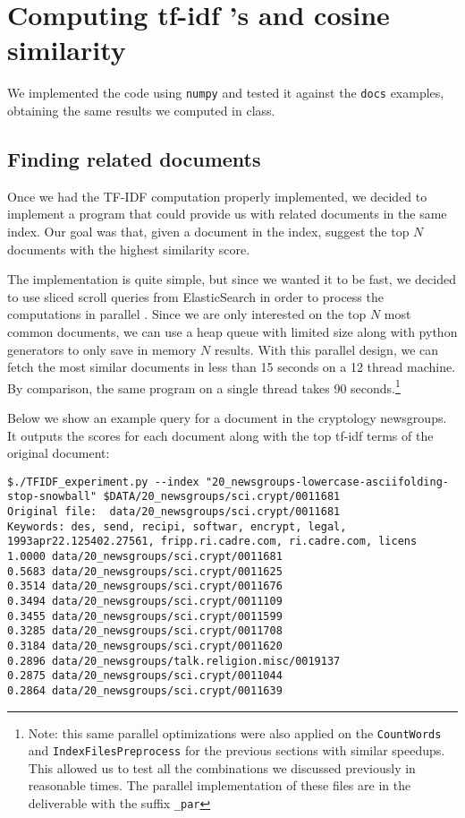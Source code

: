 \section{Computing tf-idf ’s and cosine similarity}

We implemented the code using \texttt{numpy} and tested it against the \texttt{docs} examples, obtaining
the same results we computed in class.

\subsection{Finding related documents}

Once we had the TF-IDF computation properly implemented, we decided to implement a program that could
provide us with related documents in the same index. Our goal was that, given a document in the index,
suggest the top $N$ documents with the highest similarity score.

The implementation is quite simple, but since we wanted it to be fast, we decided to use sliced scroll
queries from ElasticSearch in order to process the computations in parallel \cite{noauthor_paginate_nodate}.
Since we are only interested on the top $N$ most common documents, we can use a heap queue
with limited size along with python generators to only save in memory $N$ results. With this parallel design,
we can fetch the most similar documents in less than 15 seconds on a 12 thread machine. By comparison,
the same program on a single thread takes 90 seconds.\footnote{Note: this same parallel optimizations were also
applied on the \texttt{CountWords} and \texttt{IndexFilesPreprocess} for the previous sections with similar speedups.
This allowed us to test all the combinations we discussed previously in reasonable times.
The parallel implementation of these files are in the deliverable with the suffix \texttt{\_par}}

Below we show an example query for a document in the cryptology newsgroups. It outputs the scores for each document
along with the top tf-idf terms of the original document:
\begin{verbatim}
$./TFIDF_experiment.py --index "20_newsgroups-lowercase-asciifolding-stop-snowball" $DATA/20_newsgroups/sci.crypt/0011681
Original file:	data/20_newsgroups/sci.crypt/0011681
Keywords: des, send, recipi, softwar, encrypt, legal, 1993apr22.125402.27561, fripp.ri.cadre.com, ri.cadre.com, licens
1.0000 data/20_newsgroups/sci.crypt/0011681
0.5683 data/20_newsgroups/sci.crypt/0011625
0.3514 data/20_newsgroups/sci.crypt/0011676
0.3494 data/20_newsgroups/sci.crypt/0011109
0.3455 data/20_newsgroups/sci.crypt/0011599
0.3285 data/20_newsgroups/sci.crypt/0011708
0.3184 data/20_newsgroups/sci.crypt/0011620
0.2896 data/20_newsgroups/talk.religion.misc/0019137
0.2875 data/20_newsgroups/sci.crypt/0011044
0.2864 data/20_newsgroups/sci.crypt/0011639
\end{verbatim}

